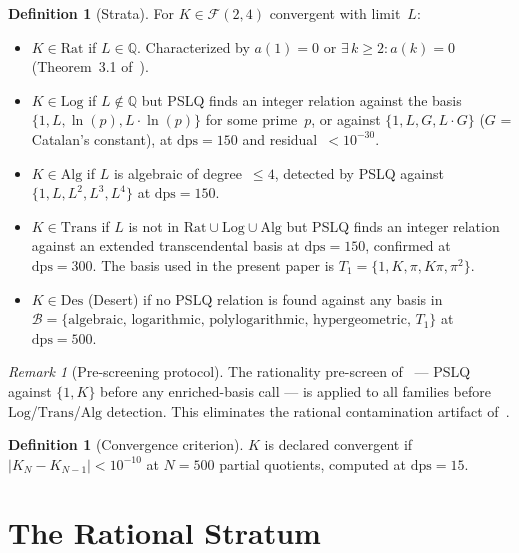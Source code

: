 \documentclass[12pt, reqno]{amsart}
\theoremstyle{definition}
\newtheorem{definition}[theorem]{Definition}
\theoremstyle{remark}
\newtheorem{remark}[theorem]{Remark}
\newcommand{\Rat}{\mathrm{Rat}}
\newcommand{\Log}{\mathrm{Log}}
\newcommand{\Alg}{\mathrm{Alg}}
\newcommand{\Trans}{\mathrm{Trans}}
\newcommand{\Des}{\mathrm{Des}}
\begin{document}
\begin{definition}[Strata]\label{def:strata}
For $K \in \mathcal{F}(2,4)$ convergent with limit~$L$:
\begin{itemize}
\item $K \in \Rat$ if $L \in \mathbb{Q}$. Characterized by $a(1)=0$ or $\exists\, k\ge 2\colon a(k)=0$ (Theorem~3.1 of~\cite{contamination}).
\item $K \in \Log$ if $L \notin \mathbb{Q}$ but PSLQ finds an integer relation against the basis
  $\{1, L, \ln(p), L \cdot \ln(p)\}$ for some prime~$p$, or against $\{1, L, G, L \cdot G\}$
  ($G$ = Catalan's constant), at $\mathrm{dps}=150$ and residual~$< 10^{-30}$.
\item $K \in \Alg$ if $L$ is algebraic of degree~$\le 4$, detected by PSLQ against
  $\{1, L, L^2, L^3, L^4\}$ at $\mathrm{dps}=150$.
\item $K \in \Trans$ if $L$ is not in $\Rat \cup \Log \cup \Alg$ but PSLQ finds an integer relation
  against an extended transcendental basis at $\mathrm{dps}=150$, confirmed at $\mathrm{dps}=300$.
  The basis used in the present paper is $T_1 = \{1, K, \pi, K\pi, \pi^2\}$.
\item $K \in \Des$ (Desert) if no PSLQ relation is found against any basis in
  $\mathcal{B} = \{\text{algebraic, logarithmic, polylogarithmic, hypergeometric, } T_1\}$ at $\mathrm{dps}=500$.
\end{itemize}
\end{definition}

\begin{remark}[Pre-screening protocol]\label{rem:prescreen}
The rationality pre-screen of~\cite{contamination}
--- PSLQ against $\{1, K\}$ before any enriched-basis call --- is applied to all
families before $\Log$/$\Trans$/$\Alg$ detection. This eliminates the rational
contamination artifact of~\cite[Remark~3.2]{contamination}.
\end{remark}

\begin{definition}[Convergence criterion]\label{def:conv}
$K$ is declared convergent if
$|K_N - K_{N-1}| < 10^{-10}$ at $N=500$ partial quotients, computed at $\mathrm{dps}=15$.
\end{definition}


\section{The Rational Stratum}\label{sec:rat}
\end{document}
